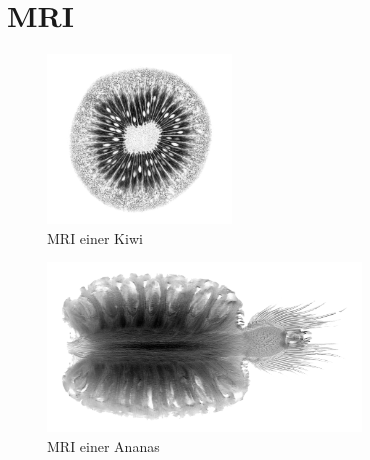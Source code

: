 \chapter{MRI\label{chapter:mri}}
\begin{refsection}

\printbibliography[heading=subbibliography]
\end{refsection}

\begin{minipage}{0.36\textwidth}
	\begin{figure}[H]
		\centering
		\includegraphics[height = 4.5cm]{./mri/pic/Kiwi.png}
		\caption{MRI einer Kiwi \cite{skript:mri:kiwi}}
		\label{mri:abb:kiwi}
	\end{figure}
\end{minipage}
\begin{minipage}{0.64\textwidth}
	\begin{figure}[H]
		\centering
		\includegraphics[height = 4.5cm]{./mri/pic/Pinaple.png}
		\caption{MRI einer Ananas \cite{skript:mri:pinaple}}
		\label{mri:abb:ananas}
	\end{figure}
\end{minipage}
\vspace*{5mm}







